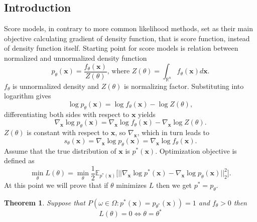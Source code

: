\documentclass[10pt]{article}
\newtheorem{Twierdzenie}{Theorem}[section]
\begin{document}
\subsection{Introduction}
Score models, in contrary to more common likelihood methods, set as their main objective calculating gradient of density function, that is score function, instead of density function itself. Starting point for score models is relation between normalized and unnormalized density function
\begin{equation}
    p_{\theta}(\textbf{x}) = \frac{f_{\theta}(\textbf{x})}{ Z(\theta)}
    \text{, where } Z(\theta) = \int_{\mathbb{R}^n} f_{\theta}(\textbf{x}) d\textbf{x}.
\end{equation}
$f_{\theta}$ is unnormalized density and $Z(\theta)$ is normalizing factor. Substituting into logarithm gives
\begin{equation}
    \log  p_{\theta}(\textbf{x}) = \log f_{\theta}(\textbf{x}) - \log Z(\theta),
\end{equation}
differentiating both sides with respect to $\textbf{x}$ yields
\begin{equation}
    \nabla_{\textbf{x}} \log  p_{\theta}(\textbf{x}) =  
    \nabla_{\textbf{x}}  \log f_{\theta}(\textbf{x}) -   \nabla_{\textbf{x}}  \log Z(\theta).
\end{equation}
$Z(\theta)$ is constant with respect to $\textbf{x}$, so $\nabla_{\textbf{x}}$, which in turn leads to 
\begin{equation}
     s_{\theta} (\textbf{x}) = \nabla_{\textbf{x}} \log  p_{\theta}(\textbf{x}) =  \nabla_{\textbf{x}}  \log f_{\theta}(\textbf{x}).
\end{equation}
Assume that the true distribution of $\textbf{x}$ is $p^*(\textbf{x})$. Optimization objective is defined as 
\begin{equation}
\label{eq:L}
    \min_{\theta} L(\theta) =  \min_{\theta} \frac{1}{2} \mathbb{E}_{p^*(\textbf{x}) } \Big[ ||\nabla_{\textbf{x}} \log p^*(\textbf{x}) -
    \nabla_{\textbf{x}} \log p_{\theta}(\textbf{x}) ||_2^2 \Big].
\end{equation}
At this point we will prove that if $\theta$ minimizes  $L$ then we get $p^* = p_{\theta}$.
\begin{Twierdzenie}
Suppose that $ P( \omega \in \Omega :  p^*(\textbf{x}) = p_{\theta^*}(\textbf{x})) = 1$ and $f_{\theta} > 0 $ then
\begin{equation}
    L(\theta) = 0 \iff \theta = \theta^*
\end{equation}
\end{Twierdzenie}
\end{document}
